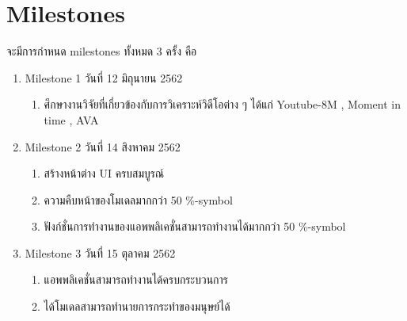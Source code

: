 \section{Milestones}จะมีการกำหนด milestones ทั้งหมด 3 ครั้ง คือ
\begin{enumerate}
	\item Milestone  1  วันที่ 12  มิถุนายน  2562
		\begin{enumerate}\setlength\itemsep{-0.25em}
			\item ศึกษางานวิจัยที่เกี่ยวข้องกับการวิเคราะห์วิดีโอต่าง ๆ  ได้แก่ Youtube-8M , Moment in time , AVA
		\end{enumerate}
	\item Milestone  2  วันที่ 14  สิงหาคม 2562
		\begin{enumerate}\setlength\itemsep{-0.25em}
			\item สร้างหน้าต่าง UI ครบสมบูรณ์
			\item ความคืบหน้าของโมเดลมากกว่า 50 \%-symbol
			\item ฟังก์ชั่นการทำงานของแอพพลิเคชั่นสามารถทำงานได้มากกว่า 50 \%-symbol
		\end{enumerate}
	\item Milestone  3  วันที่ 15  ตุลาคม 2562
		\begin{enumerate}\setlength\itemsep{-0.25em}
			\item แอพพลิเคชั่นสามารถทำงานได้ครบกระบวนการ
			\item ได้โมเดลสามารถทำนายการกระทำของมนุษย์ได้
		\end{enumerate}
\end{enumerate}




